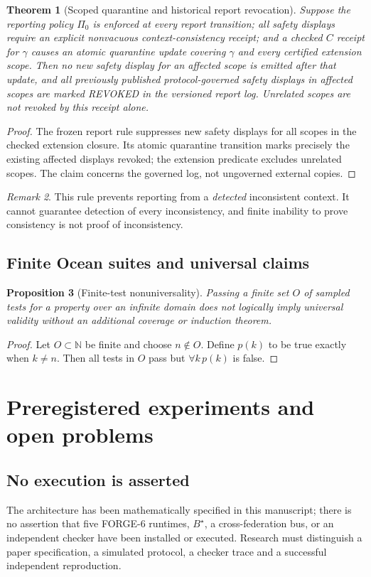 \documentclass[11pt,letterpaper,oneside]{book}
\newtheorem{theorem}{Theorem}[chapter]
\newtheorem{proposition}[theorem]{Proposition}
\theoremstyle{definition}
\theoremstyle{remark}
\newtheorem{remark}[theorem]{Remark}
\begin{document}
\begin{theorem}[Scoped quarantine and historical report revocation]
Suppose the reporting policy $\Pi_0$ is enforced at every report
transition; all safety displays require an explicit nonvacuous
context-consistency receipt; and a checked $C$ receipt for $\gamma$
causes an atomic quarantine update covering $\gamma$ and every
certified extension scope. Then no \emph{new} safety display for an
affected scope is emitted after that update, and all previously
published \emph{protocol-governed} safety displays in affected scopes
are marked \textsf{REVOKED} in the versioned report log.
Unrelated scopes are not revoked by this receipt alone.
\end{theorem}
\begin{proof}
The frozen report rule suppresses new safety displays for all scopes
in the checked extension closure. Its atomic quarantine transition
marks precisely the existing affected displays revoked; the extension
predicate excludes unrelated scopes. The claim concerns the governed
log, not ungoverned external copies.
\end{proof}
\begin{remark}
This rule prevents reporting from a \emph{detected} inconsistent
context. It cannot guarantee detection of every inconsistency, and
finite inability to prove consistency is not proof of inconsistency.
\end{remark}

\section{Finite Ocean suites and universal claims}
\begin{proposition}[Finite-test nonuniversality]
Passing a finite set $O$ of sampled tests for a property over an
infinite domain does not logically imply universal validity without
an additional coverage or induction theorem.
\end{proposition}
\begin{proof}
Let $O\subset\mathbb N$ be finite and choose $n\notin O$.
Define $p(k)$ to be true exactly when $k\ne n$. Then all tests in
$O$ pass but $\forall k\,p(k)$ is false.\end{proof}

\chapter{Preregistered experiments and open problems}
\section{No execution is asserted}
The architecture has been mathematically specified in this manuscript;
there is no assertion that five FORGE-6 runtimes, $B^\star$, a
cross-federation bus, or an independent checker have been installed
or executed. Research must distinguish a paper specification, a
simulated protocol, a checker trace and a successful independent
reproduction.
\end{document}
